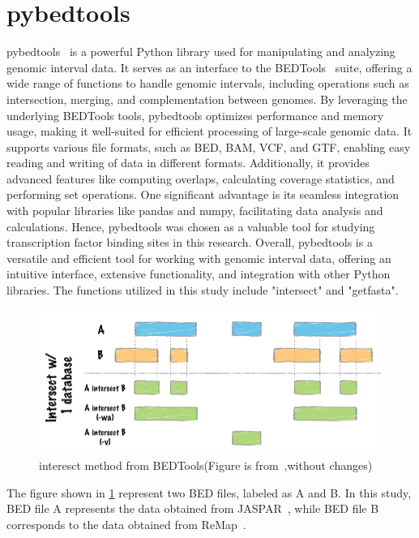 \documentclass{PHlab-thesis}
\begin{document}
\section{pybedtools}
pybedtools~\cite{10.1093/bioinformatics/btr539} is a powerful Python library used for manipulating and analyzing genomic interval data. It serves as an interface to the BEDTools~\cite{10.1093/bioinformatics/btq033} suite, offering a wide range of functions to handle genomic intervals, including operations such as intersection, merging, and complementation between genomes. By leveraging the underlying BEDTools tools, pybedtools optimizes performance and memory usage, making it well-suited for efficient processing of large-scale genomic data. It supports various file formats, such as BED, BAM, VCF, and GTF, enabling easy reading and writing of data in different formats. Additionally, it provides advanced features like computing overlaps, calculating coverage statistics, and performing set operations. One significant advantage is its seamless integration with popular libraries like pandas and numpy, facilitating data analysis and calculations. Hence, pybedtools was chosen as a valuable tool for studying transcription factor binding sites in this research. Overall, pybedtools is a versatile and efficient tool for working with genomic interval data, offering an intuitive interface, extensive functionality, and integration with other Python libraries. The functions utilized in this study include "intersect" and "getfasta".
\begin{figure}[H]
	\centering
	\includegraphics[scale=0.5]{figures/intersect-glyph.png}
	\caption{interesct method from BEDTools(Figure is from~\cite{10.1093/bioinformatics/btq033},without changes)}
	\label{fig:interesct} %
\end{figure}
The figure shown in \ref*{fig:interesct} represent two BED files, labeled as A and B. In this study, BED file A represents the data obtained from JASPAR~\cite{10.1093/nar/gkab1113}, while BED file B corresponds to the data obtained from ReMap~\cite{ReMapFayrouz2022}.
\end{document}
